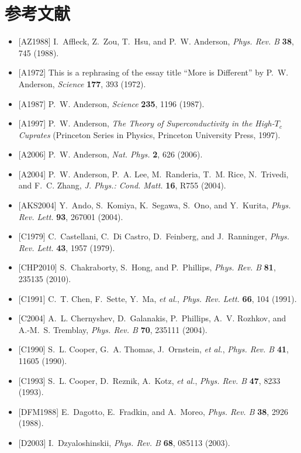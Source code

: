 \section*{参考文献}

\begin{itemize}[leftmargin=2em,itemsep=0pt,parsep=0pt,label={}]
\item {[AZ1988]} I.~Affleck, Z.~Zou, T.~Hsu, and P.~W. Anderson, \emph{Phys. Rev. B} \textbf{38}, 745 (1988).
\item {[A1972]} This is a rephrasing of the essay title ``More is Different'' by P.~W. Anderson, \emph{Science} \textbf{177}, 393 (1972).
\item {[A1987]} P.~W. Anderson, \emph{Science} \textbf{235}, 1196 (1987).
\item {[A1997]} P.~W. Anderson, \emph{The Theory of Superconductivity in the High-$T_{c}$ Cuprates} (Princeton Series in Physics, Princeton University Press, 1997).
\item {[A2006]} P.~W. Anderson, \emph{Nat. Phys.} \textbf{2}, 626 (2006).
\item {[A2004]} P.~W. Anderson, P.~A. Lee, M.~Randeria, T.~M. Rice, N.~Trivedi, and F.~C. Zhang, \emph{J. Phys.: Cond. Matt.} \textbf{16}, R755 (2004).
\item {[AKS2004]} Y.~Ando, S.~Komiya, K.~Segawa, S.~Ono, and Y.~Kurita, \emph{Phys. Rev. Lett.} \textbf{93}, 267001 (2004).
\item {[C1979]} C.~Castellani, C.~Di Castro, D.~Feinberg, and J.~Ranninger, \emph{Phys. Rev. Lett.} \textbf{43}, 1957 (1979).
\item {[CHP2010]} S.~Chakraborty, S.~Hong, and P.~Phillips, \emph{Phys. Rev. B} \textbf{81}, 235135 (2010).
\item {[C1991]} C.~T. Chen, F.~Sette, Y.~Ma, \emph{et al.}, \emph{Phys. Rev. Lett.} \textbf{66}, 104 (1991).
\item {[C2004]} A.~L. Chernyshev, D.~Galanakis, P.~Phillips, A.~V. Rozhkov, and A.-M.~S. Tremblay, \emph{Phys. Rev. B} \textbf{70}, 235111 (2004).
\item {[C1990]} S.~L. Cooper, G.~A. Thomas, J.~Ornstein, \emph{et al.}, \emph{Phys. Rev. B} \textbf{41}, 11605 (1990).
\item {[C1993]} S.~L. Cooper, D.~Reznik, A.~Kotz, \emph{et al.}, \emph{Phys. Rev. B} \textbf{47}, 8233 (1993).
\item {[DFM1988]} E.~Dagotto, E.~Fradkin, and A.~Moreo, \emph{Phys. Rev. B} \textbf{38}, 2926 (1988).
\item {[D2003]} I.~Dzyaloshinskii, \emph{Phys. Rev. B} \textbf{68}, 085113 (2003).

\end{itemize}
